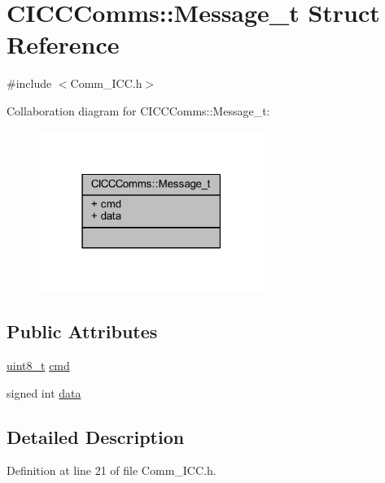 \hypertarget{struct_c_i_c_c_comms_1_1_message__t}{}\section{C\+I\+C\+C\+Comms\+:\+:Message\+\_\+t Struct Reference}
\label{struct_c_i_c_c_comms_1_1_message__t}


{\ttfamily \#include $<$Comm\+\_\+\+I\+C\+C.\+h$>$}



Collaboration diagram for C\+I\+C\+C\+Comms\+:\+:Message\+\_\+t\+:
\nopagebreak
\begin{figure}[H]
\begin{center}
\leavevmode
\includegraphics[width=207pt]{struct_c_i_c_c_comms_1_1_message__t__coll__graph}
\end{center}
\end{figure}
\subsection*{Public Attributes}
\begin{DoxyCompactItemize}
\item 
\mbox{\hyperlink{_a_d_a_s___types_8h_aba7bc1797add20fe3efdf37ced1182c5}{uint8\+\_\+t}} \mbox{\hyperlink{struct_c_i_c_c_comms_1_1_message__t_adf3e3290f54ee3997bc837463a340d05}{cmd}}
\item 
signed int \mbox{\hyperlink{struct_c_i_c_c_comms_1_1_message__t_a25cfce11e78d103524b695b281629d75}{data}}
\end{DoxyCompactItemize}


\subsection{Detailed Description}


Definition at line 21 of file Comm\+\_\+\+I\+C\+C.\+h.



